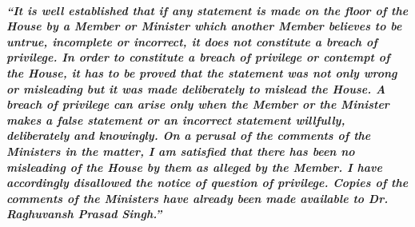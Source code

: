 \paragraph*{\emph{``It is well established that if any statement is made on the floor of the House by a Member or Minister which another Member believes to be untrue, incomplete or incorrect, it does not constitute a breach of privilege.  In order to constitute a breach of privilege or contempt of the House, it has to be proved that the statement was not only wrong or misleading but it was made deliberately to mislead the House.  A breach of privilege can arise only when the Member or the Minister makes a false statement or an incorrect statement willfully, deliberately and knowingly.    On a perusal of the comments of the Ministers in the matter, I am satisfied that there has been no misleading of the House by them as alleged by the Member.   I have accordingly disallowed the notice of question of privilege.  Copies of the comments of the Ministers have already been made available to Dr. Raghuvansh Prasad Singh.''}}
